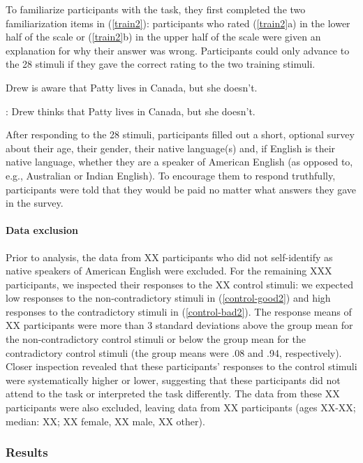 \documentclass[11pt,fleqn]{article}
\newcommand{\6}{\mbox{$[\hspace*{-.6mm}[$}}
\newcommand{\9}{\mbox{$]\hspace*{-.6mm}]$}}
\begin{document}
To familiarize participants with the task, they first completed the two familiarization items in (\ref{train2}): participants who rated (\ref{train2}a) in the lower half of the scale or (\ref{train2}b) in the upper half of the scale were given an explanation for why their answer was wrong. Participants could only advance to the 28 stimuli if they gave the correct rating to the two training stimuli.

\begin{exe}
\ex\label{train2}
\begin{xlist}
 Drew is aware that Patty lives in Canada, but she doesn't.

: Drew thinks that Patty lives in Canada, but she doesn't.
\end{xlist}
\end{exe}

After responding to the 28 stimuli, participants filled out a short, optional survey about their age, their gender, their native language(s) and, if English is their native language, whether they are a speaker of American English (as opposed to, e.g., Australian or Indian English). To encourage them to respond truthfully, participants were told that they would be paid no matter what answers they gave in the survey.

\paragraph{Data exclusion}
Prior to analysis, the data from XX participants who did not self-identify as native speakers of American English were excluded. For the remaining XXX participants, we inspected their responses to the XX control stimuli: we expected low responses to the non-contradictory stimuli in (\ref{control-good2}) and high responses to the contradictory stimuli in (\ref{control-bad2}). The response means of XX participants were more than 3 standard deviations above the group mean for the non-contradictory control stimuli or below the group mean for the contradictory control stimuli (the group means were .08 and .94, respectively). Closer inspection revealed that these participants' responses to the control stimuli were systematically higher or lower, suggesting that these participants did not attend to the task or interpreted the task differently. The data from these XX participants were also excluded, leaving data from XX participants (ages XX-XX; median: XX; XX female, XX male, XX other).  

\subsubsection{Results}
\end{document}
